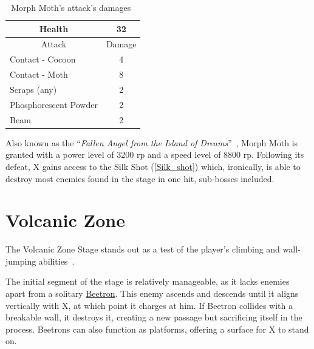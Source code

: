 \begin{table}[htp]
	\centering
	\begin{tabular}[h]{l c}
		\toprule
		\multicolumn{1}{c}{Health}  & 32 \\
		\midrule
		\multicolumn{1}{c}{Attack} & \multicolumn{1}{c}{Damage}\\
		Contact - Cocoon & 4 \\
		Contact - Moth& 8\\
		Scraps (any) & 2\\
		Phosphorescent Powder& 2\\
		Beam & 2\\
		\bottomrule
	\end{tabular}
	\caption{Morph Moth's attack's damages~\cite{wiki:Morph_moth,book:Compendium}}
\end{table}
Also known as the ``\textit{Fallen Angel from the Island of Dreams}''~\cite{book:MMX_Complete_art}, Morph Moth is granted with a power level of 3200 rp and a speed level of 8800 rp. Following its defeat, X gains access to the Silk Shot (\ref{Silk_shot}) which, ironically, is able to destroy most enemies found in the stage in one hit, sub-bosses included.


\section{Volcanic Zone}
The Volcanic Zone Stage stands out as a test of the player's climbing and wall-jumping abilities~\cite{stratwiki:Volcanic_zone}.

The initial segment of the stage is relatively manageable, as it lacks enemies apart from a solitary \hyperlink{enem:Beetron}{Beetron}. This enemy ascends and descends until it aligns vertically with X, at which point it charges at him. If Beetron collides with a breakable wall, it destroys it, creating a new passage but sacrificing itself in the process. Beetrons can also function as platforms, offering a surface for X to stand on.

